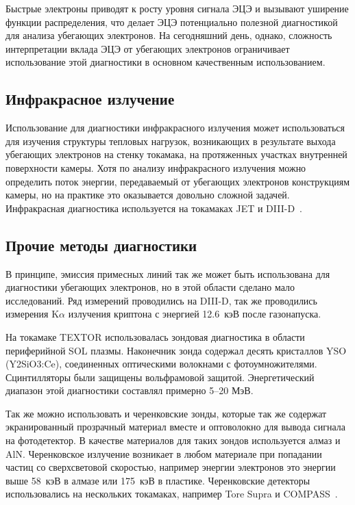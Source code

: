 Быстрые электроны приводят к росту уровня сигнала ЭЦЭ и вызывают уширение функции распределения, что делает ЭЦЭ потенциально полезной диагностикой для анализа убегающих электронов. На сегодняшний день, однако, сложность интерпретации вклада ЭЦЭ от убегающих электронов ограничивает использование этой диагностики в основном качественным использованием.~\cite{Breizman2019} 


\subsection{ Инфракрасное излучение }

Использование для диагностики инфракрасного излучения может использоваться для изучения структуры тепловых нагрузок, возникающих в результате выхода убегающих электронов на стенку токамака, на протяженных участках внутренней поверхности камеры. Хотя по анализу инфракрасного излучения можно определить поток энергии, передаваемый от убегающих электронов конструкциям камеры, но на практике это оказывается довольно сложной задачей. Инфракрасная диагностика используется на токамаках JET и DIII-D~\cite{Breizman2019,Lehnen2009,Hollmann2017}.


\subsection{Прочие методы диагностики}

В принципе, эмиссия примесных линий так же может быть использована для диагностики убегающих электронов, но в этой области сделано мало исследований. Ряд измерений проводились на DIII-D, так же проводились измерения K$\alpha$ излучения криптона с энергией 12.6~кэВ после газонапуска.~\cite{Breizman2019}

На токамаке TEXTOR использовалась зондовая диагностика в области периферийной SOL плазмы. Наконечник зонда содержал десять кристаллов YSO (Y2SiO3:Ce), соединенных оптическими волокнами с фотоумножителями. Сцинтилляторы были защищены вольфрамовой защитой. Энергетический диапазон этой диагностики составлял примерно 5–20 МэВ.~\cite{Kudyakov2008} 

Так же можно использовать и черенковские зонды, которые так же содержат экранированный прозрачный материал вместе и оптоволокно для вывода сигнала на фотодетектор. В качестве материалов для таких зондов используется алмаз и AlN. Черенковское излучение возникает в любом материале при попадании частиц со сверхсветовой скоростью, например энергии электронов это энергии выше 58~кэВ в алмазе или 175~кэВ в пластике. Черенковские детекторы использовались на нескольких токамаках, например Tore Supra и COMPASS~\cite{Zebrowski2018}.

